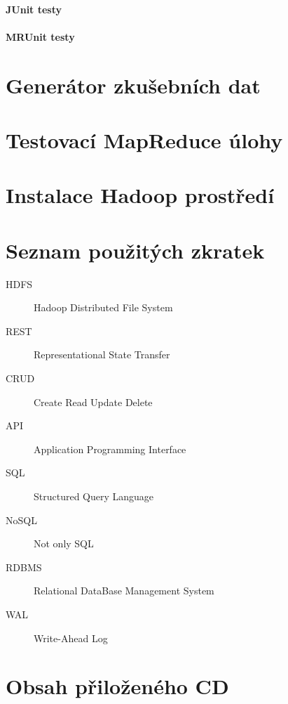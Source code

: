 \documentclass[thesis=M,czech]{FITthesis}[2012/06/26]
\begin{document}
\subsubsection{JUnit testy}
\subsubsection{MRUnit testy}



\begin{conclusion}
\end{conclusion}




\appendix

\chapter{Generátor zkušebních dat}
\chapter{Testovací MapReduce úlohy}
\chapter{Instalace Hadoop prostředí}

\chapter{Seznam použitých zkratek}
\begin{description}
	\item[HDFS] Hadoop Distributed File System
	\item[REST] Representational State Transfer
	\item[CRUD] Create Read Update Delete
	\item[API] Application Programming Interface
	\item[SQL] Structured Query Language
	\item[NoSQL] Not only SQL
	\item[RDBMS] Relational DataBase Management System
	\item[WAL] Write-Ahead Log
	

\end{description}




\chapter{Obsah přiloženého CD}


\begin{figure}
\end{figure}
\end{document}
